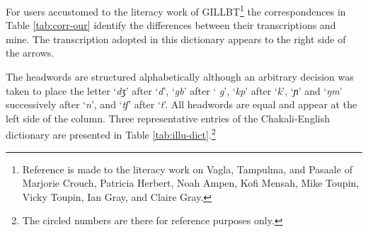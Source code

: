 For users accustomed to the literacy work of GILLBT\footnote{Reference is made
to the literacy work on Vagla,  Tampulma, and Pasaale  of Marjorie 
Crouch\dag, Patricia Herbert, Noah Ampen, Kofi
Mensah,
Mike Toupin, Vicky Toupin, Ian Gray,  and Claire Gray.} the correspondences
in Table \ref{tab:corr-our} identify the differences between their 
transcriptions and mine. The
transcription adopted in this dictionary  appears to the right side of the 
arrows. 


\begin{table}[h]
\caption[]{Correspondences of orthographies\label{tab:corr-our}}
 \begin{center}
\end{center}
\end{table}



The headwords  are structured alphabetically  although an arbitrary decision was 
taken to place the letter `{\it  dʒ}' after `{\it  d}', `{\it  gb}' after `{\it  
g}', 
`{\it  kp}' after `{\it  k}',  `{\it  ɲ}'  and `{\it  ŋm}' successively after 
`{\it  n}',  
and `{\it  tʃ}' after `{\it  t}'.  All headwords are equal and appear at the 
left 
side of the column. Three representative entries of the Chakali-English 
dictionary are presented in Table \ref{tab:illu-dict}.\footnote{The circled 
numbers are there for reference purposes only.}

